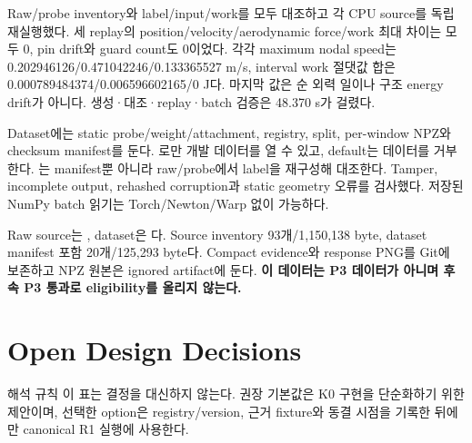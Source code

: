 \documentclass[10pt]{article}
\begin{document}
Raw/probe inventory와 label/input/work를 모두 대조하고 각 CPU source를 독립 재실행했다.
세 replay의 position/velocity/aerodynamic force/work 최대 차이는 모두 0,
pin drift와 guard count도 0이었다. 각각 maximum nodal speed는
0.202946126/0.471042246/0.133365527 m/s,
interval work 절댓값 합은 0.000789484374/0.006596602165/0 J다.
마지막 값은 순 외력 일이나 구조 energy drift가 아니다.
생성·대조·replay·batch 검증은 48.370 s가 걸렸다.

Dataset에는 static probe/weight/attachment, registry, split, per-window NPZ와 checksum manifest를 둔다.
로만 개발 데이터를 열 수 있고,
default는  데이터를 거부한다.
는 manifest뿐 아니라 raw/probe에서 label을 재구성해 대조한다.
Tamper, incomplete output, rehashed corruption과 static geometry 오류를 검사했다.
저장된 NumPy batch 읽기는 Torch/Newton/Warp 없이 가능하다.

Raw source는 ,
dataset은 다.
Source inventory 93개/1,150,138 byte, dataset manifest 포함 20개/125,293 byte다.
Compact evidence와 response PNG를 Git에 보존하고 NPZ 원본은 ignored artifact에 둔다.
\textbf{이 데이터는 P3 데이터가 아니며 후속 P3 통과로 eligibility를 올리지 않는다.}

\section{Open Design Decisions}
\label{sec:r1-chapter-5}
\label{sec:r1-decisions}

\begin{decisionbox}{해석 규칙}
이 표는 결정을 대신하지 않는다. 권장 기본값은 K0 구현을 단순화하기 위한 제안이며,
선택한 option은 registry/version, 근거 fixture와 동결 시점을 기록한 뒤에만 canonical R1 실행에 사용한다.
\end{decisionbox}
\end{document}
